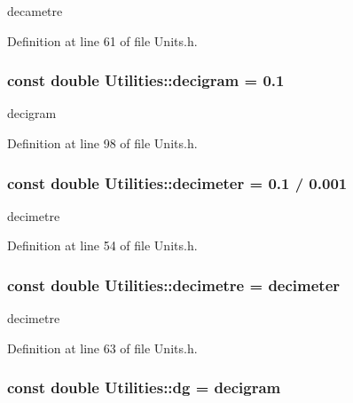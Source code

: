 decametre 



Definition at line 61 of file Units.h.

\hypertarget{namespace_utilities_a19cffac32ac7c8d1d469398620265431}{
\subsubsection[{decigram}]{\setlength{\rightskip}{0pt plus 5cm}const double {\bf Utilities::decigram} = 0.1}}
\label{namespace_utilities_a19cffac32ac7c8d1d469398620265431}


decigram 



Definition at line 98 of file Units.h.

\hypertarget{namespace_utilities_a66145380051759756714059815f45e18}{
\subsubsection[{decimeter}]{\setlength{\rightskip}{0pt plus 5cm}const double {\bf Utilities::decimeter} = 0.1 / 0.001}}
\label{namespace_utilities_a66145380051759756714059815f45e18}


decimetre 



Definition at line 54 of file Units.h.

\hypertarget{namespace_utilities_acd1e513cc56efd8a5f237271a46afcfe}{
\subsubsection[{decimetre}]{\setlength{\rightskip}{0pt plus 5cm}const double {\bf Utilities::decimetre} = {\bf decimeter}}}
\label{namespace_utilities_acd1e513cc56efd8a5f237271a46afcfe}


decimetre 



Definition at line 63 of file Units.h.

\hypertarget{namespace_utilities_a0560b0dea05b99f76fe3209784c11a14}{
\subsubsection[{dg}]{\setlength{\rightskip}{0pt plus 5cm}const double {\bf Utilities::dg} = {\bf decigram}}}
\label{namespace_utilities_a0560b0dea05b99f76fe3209784c11a14}


